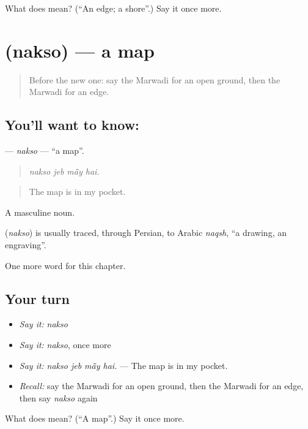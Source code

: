 \begin{tcolorbox}[breakable,colback=teal!4,colframe=teal!35!black,title={Before you move on}]
What does  mean? (\textquotedblleft{}An edge; a shore\textquotedblright{}.) Say it once more.
\end{tcolorbox}
\section[\texorpdfstring{\mw{नक्सो} (nakso)}{नक्सो (nakso)}]{ (nakso) — a map}

\label{lesson:MW-C204-nakso}



\begin{quote}
Before the new one: say the Marwadi for an open ground, then the Marwadi for an edge.
\end{quote}

\subsection*{You'll want to know: }
\textbf{} — \emph{nakso} — \textquotedblleft{}a map\textquotedblright{}.

\begin{quote}
   
\end{quote}

\begin{quote}
\emph{nakso jeb mā̃y hai.}
\end{quote}

\begin{quote}
The map is in my pocket.
\end{quote}

A masculine noun.

\begin{cousinweb}
\textbf{} (\emph{nakso}) is usually traced, through Persian, to Arabic \emph{naqsh}, \textquotedblleft{}a drawing, an engraving\textquotedblright{}.
\end{cousinweb}

\begin{grammarlens}[title={What you've built}]
One more word for this chapter.
\end{grammarlens}

\subsection*{Your turn}
\begin{itemize}
\raggedright
  \item \emph{Say it:} \emph{nakso}
  \item \emph{Say it:} \emph{nakso}, once more
  \item \emph{Say it:} \emph{nakso jeb mā̃y hai.} — The map is in my pocket.
  \item \emph{Recall:} say the Marwadi for an open ground, then the Marwadi for an edge, then say \emph{nakso} again
\end{itemize}

\begin{tcolorbox}[breakable,colback=teal!4,colframe=teal!35!black,title={Before you move on}]
What does  mean? (\textquotedblleft{}A map\textquotedblright{}.) Say it once more.
\end{tcolorbox}
